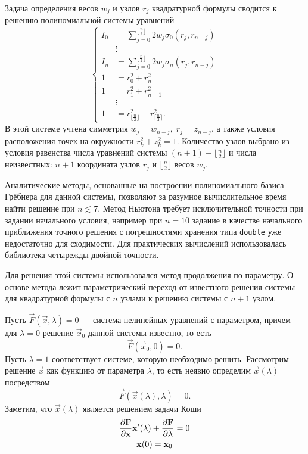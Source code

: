 Задача определения весов $w_j$ и узлов $r_j$ квадратурной формулы сводится к решению полиномиальной системы уравнений
\begin{equation}
\begin{cases}
I_0 &= \sum_{j=0}^{\lfloor \frac{n}{2} \rfloor} 2 w_j \sigma_0(r_j, r_{n - j})\\
&\vdots\\
I_n &= \sum_{j=0}^{\lfloor \frac{n}{2} \rfloor} 2 w_j \sigma_n(r_j, r_{n - j})\\
1 &= r_0^2 + r_n^2\\
1 &= r_1^2 + r_{n-1}^2\\
& \vdots\\
1 &= r_{\lfloor \frac{n}{2} \rfloor}^2 + r_{\lceil \frac{n}{2} \rceil}^2.
\end{cases}
\label{eq:polysys}
\end{equation}
В этой системе учтена симметрия $w_j = w_{n-j},\; r_j = z_{n-j}$, а также условия расположения точек на окружности $r_k^2 + z_k^2 = 1$. Количество узлов выбрано из условия равенства числа уравнений системы $(n + 1) + \lfloor \frac{n}{2} \rfloor$ и числа неизвестных: $n+1$ координата узлов $r_j$ и $ \lfloor \frac{n}{2} \rfloor$ весов $w_j$.

Аналитические методы, основанные на построении полиномиального базиса Грёбнера \cite{Buchberger} для данной системы, позволяют за разумное вычислительное время найти решение при $n \lesssim 7$. Метод Ньютона требует исключительной точности при задании начального условия, например при $n = 10$ задание в качестве начального приближения точного решения с погрешностями хранения типа \texttt{double} уже недостаточно для сходимости. Для практических вычислений использовалась библиотека \cite{quad-double} четырежды-двойной точности.

Для решения этой системы использовался метод продолжения по параметру. О основе метода лежит параметрический переход от известного решения системы для квадратурной формулы с $n$ узлами к решению системы с $n+1$ узлом.

Пусть $\vec F(\vec x, \lambda) = 0$ --- система нелинейных уравнений с параметром, причем для $\lambda = 0$ решение $\vec x_0$ данной системы известно, то есть
\[
\vec F(\vec x_0, 0) = 0.
\]
Пусть $\lambda = 1$ соответствует системе, которую необходимо решить. Рассмотрим решение $\vec x$ как функцию от параметра $\lambda$, то есть неявно определим $\vec x(\lambda)$ посредством
\[
\vec F(\vec x(\lambda), \lambda) = 0.
\]
Заметим, что $\vec x(\lambda)$ является решением задачи Коши
\begin{gather*}
\frac{\partial \boldsymbol{\mathbf{F}}}{\partial \boldsymbol{\mathbf{x}}} \boldsymbol{\mathbf{x}}'(\lambda) + \frac{\partial \boldsymbol{\mathbf{F}}}{\partial \lambda} = 0\\
\boldsymbol{\mathbf{x}}(0) = \boldsymbol{\mathbf{x}}_0
\end{gather*}

